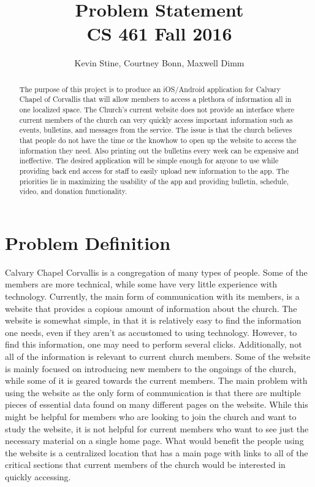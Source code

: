 \documentclass[letterpaper,10pt,draftclsnofoot,onecolumn,titlepage]{IEEEtran}
\def\name{Kevin Stine, Courtney Bonn, Maxwell Dimm}
\begin{document}
	\title{\huge Problem Statement \\ CS 461 Fall 2016}
	\author{\large \name}

	\maketitle
		\begin{abstract}The purpose of this project is to produce an iOS/Android application for Calvary Chapel of Corvallis that will allow members to access a plethora of information all in one localized space.
		The Church's current website does not provide an interface where current members of the church can very quickly access important information such as events, bulletins, and messages from the service.
		The issue is that the church believes that people do not have the time or the knowhow to open up the website to access the information they need.
		Also printing out the bulletins every week can be expensive and ineffective.
		The desired application will be simple enough for anyone to use while providing back end access for staff to easily upload new information to the app.
		The priorities lie in maximizing the usability of the app and providing bulletin, schedule, video, and donation functionality.
		\end{abstract}

	\clearpage

	\section*{Problem Definition}
	Calvary Chapel Corvallis is a congregation of many types of people.
	Some of the members are more technical, while some have very little experience with technology.
	Currently, the main form of communication with its members, is a website that provides a copious amount of information about the church.
	The website is somewhat simple, in that it is relatively easy to find the information one needs, even if they aren't as accustomed to using technology.
	However, to find this information, one may need to perform several clicks.
	Additionally, not all of the information is relevant to current church members.
	Some of the website is mainly focused on introducing new members to the ongoings of the church, while some of it is geared towards the current members.
	The main problem with using the website as the only form of communication is that there are multiple pieces of essential data found on many different pages on the website.
	While this might be helpful for members who are looking to join the church and want to study the website, it is not helpful for current members who want to see just the necessary material on a single home page.
	What would benefit the people using the website is a centralized location that has a main page with links to all of the critical sections that current members of the church would be interested in quickly accessing.
\end{document}
